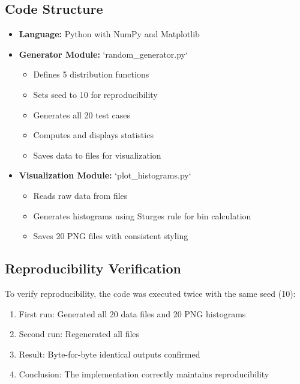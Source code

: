 \documentclass[12pt]{article}
\begin{document}
\subsection{Code Structure}

\begin{itemize}
    \item \textbf{Language:} Python with NumPy and Matplotlib
    \item \textbf{Generator Module:} `random\_generator.py`
          \begin{itemize}
              \item Defines 5 distribution functions
              \item Sets seed to 10 for reproducibility
              \item Generates all 20 test cases
              \item Computes and displays statistics
              \item Saves data to files for visualization
          \end{itemize}
    \item \textbf{Visualization Module:} `plot\_histograms.py`
          \begin{itemize}
              \item Reads raw data from files
              \item Generates histograms using Sturges rule for bin calculation
              \item Saves 20 PNG files with consistent styling
          \end{itemize}
\end{itemize}

\subsection{Reproducibility Verification}

To verify reproducibility, the code was executed twice with the same seed (10):
\begin{enumerate}
    \item First run: Generated all 20 data files and 20 PNG histograms
    \item Second run: Regenerated all files
    \item Result: Byte-for-byte identical outputs confirmed
    \item Conclusion: The implementation correctly maintains reproducibility
\end{enumerate}
\end{document}

